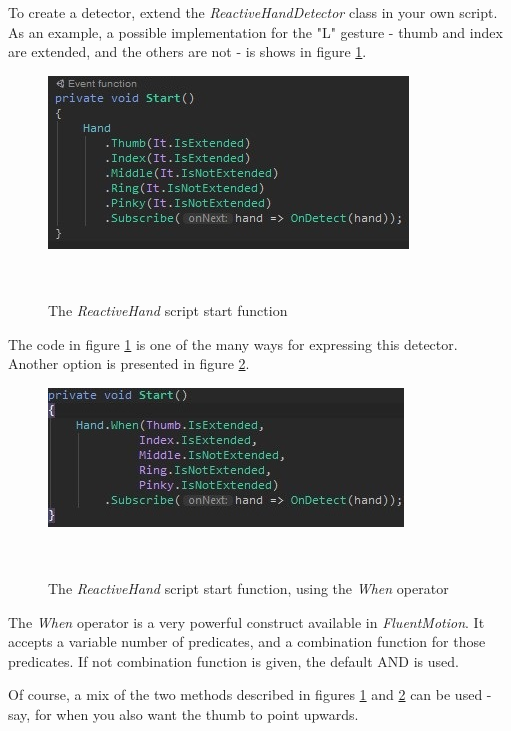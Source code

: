 \documentclass{sigchi}
\def\fluentmotion{\textit{FluentMotion}}
\begin{document}
To create a detector, extend the \textit{ReactiveHandDetector} class in your own script. As an example, a possible implementation for the "L" gesture - thumb and index are extended, and the others are not - is shows in figure \ref{fig:figure7}.

\begin{figure}[h]
  \centering
  \includegraphics[width=0.9\columnwidth]{figures/FluentMotion_script}
  \caption{The \textit{ReactiveHand} script start function}~\label{fig:figure7}
\end{figure}

The code in figure \ref{fig:figure7} is one of the many ways for expressing this detector. Another option is presented in figure \ref{fig:figure8}.

\begin{figure}[H]
  \centering
  \includegraphics[width=0.9\columnwidth]{figures/FluentMotion_script_alternative}
  \caption{The \textit{ReactiveHand} script start function, using the \textit{When} operator}~\label{fig:figure8}
\end{figure}

The \textit{When} operator is a very powerful construct available in \fluentmotion{}. It accepts a variable number of predicates, and a combination function for those predicates. If not combination function is given, the default AND is used.


Of course, a mix of the two methods described in figures \ref{fig:figure7} and \ref{fig:figure8} can be used - say, for when you also want the thumb to point upwards.
\end{document}
